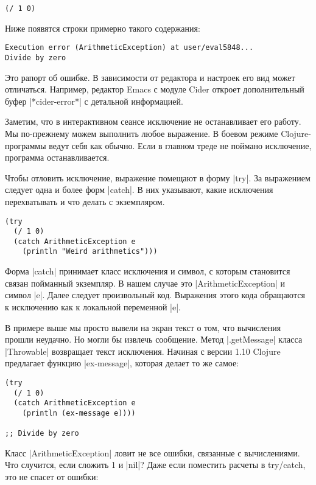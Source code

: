 \begin{verbatim}
(/ 1 0)
\end{verbatim}

Ниже появятся строки примерно такого содержания:

\begin{verbatim}
Execution error (ArithmeticException) at user/eval5848...
Divide by zero
\end{verbatim}

Это рапорт об ошибке. В зависимости от редактора и настроек его вид может
отличаться. Например, редактор Emacs с модуле Cider откроет дополнительный буфер
\spverb|*cider-error*| с детальной информацией.

Заметим, что в интерактивном сеансе исключение не останавливает его работу. Мы
по-прежнему можем выполнить любое выражение. В боевом режиме Clojure-программы
ведут себя как обычно. Если в главном треде не поймано исключение, программа
останавливается.

Чтобы отловить исключение, выражение помещают в форму \spverb|try|. За выражением
следует одна и более форм \spverb|catch|. В них указывают, какие исключения
перехватывать и что делать с экземпляром.

\begin{verbatim}
(try
  (/ 1 0)
  (catch ArithmeticException e
    (println "Weird arithmetics")))
\end{verbatim}

Форма \spverb|catch| принимает класс исключения и символ, с которым становится связан
пойманный экземпляр. В нашем случае это \spverb|ArithmeticException| и символ
\spverb|e|. Далее следует произвольный код. Выражения этого кода обращаются к
исключению как к локальной переменной \spverb|e|.

В примере выше мы просто вывели на экран текст о том, что вычисления прошли
неудачно. Но могли бы извлечь сообщение. Метод \spverb|.getMessage| класса \spverb|Throwable|
возвращает текст исключения. Начиная с версии 1.10 Clojure предлагает функцию
\spverb|ex-message|, которая делает то же самое:

\begin{verbatim}
(try
  (/ 1 0)
  (catch ArithmeticException e
    (println (ex-message e))))

;; Divide by zero
\end{verbatim}

Класс \spverb|ArithmeticException| ловит не все ошибки, связанные с вычислениями. Что
случится, если сложить 1 и \spverb|nil|? Даже если поместить расчеты в try/catch, это
не спасет от ошибки:

